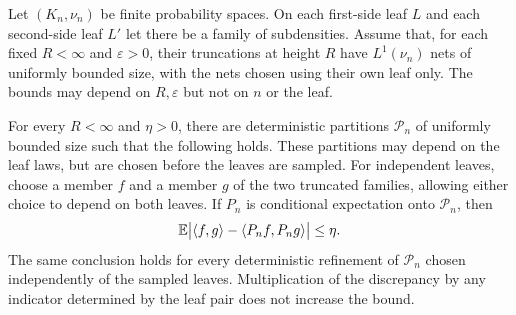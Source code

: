 \begin{lemma}
\label{lem:limit-global-projection}
Let $(K_n,\nu_n)$ be finite probability spaces. On each first-side leaf
$L$ and each second-side leaf $L'$ let there be a family of subdensities.
Assume that, for each fixed $R<\infty$ and $\varepsilon>0$, their
truncations at height $R$ have $L^1(\nu_n)$ nets of uniformly bounded
size, with the nets chosen using their own leaf only. The bounds may
depend on $R,\varepsilon$ but not on $n$ or the leaf.

For every $R<\infty$ and $\eta>0$, there are deterministic partitions
$\mathcal P_n$ of uniformly bounded size such that the following holds.
These partitions may depend on the leaf laws, but are chosen before
the leaves are sampled.
For independent leaves, choose a member $f$ and a member $g$ of the two
truncated families, allowing either choice to depend on both leaves.
If $P_n$ is conditional expectation onto $\mathcal P_n$, then
\begin{equation}
\label{eq:limit-projection-error}
\mathbb E\bigl|\langle f,g\rangle-\langle P_nf,P_ng\rangle\bigr|\le\eta.
\end{equation}
The same conclusion holds for every deterministic refinement of
$\mathcal P_n$ chosen independently of the sampled leaves.
Multiplication of the discrepancy by any indicator determined by the
leaf pair does not increase the bound.
\end{lemma}

